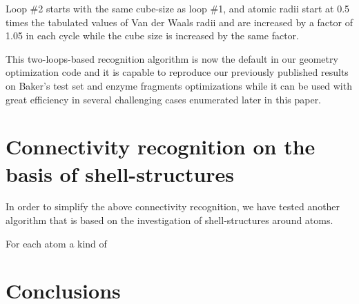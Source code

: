 \documentclass[prl,aps,preprint,superbib,12pt]{revtex4}
\begin{document}
Loop \#2 starts with the same cube-size as loop \#1, 
and atomic radii start at 0.5 times the tabulated values of 
Van der Waals radii \cite{webelements} and are increased by a 
factor of 1.05 in each cycle while the cube size is increased
by the same factor.

This two-loops-based recognition algorithm is now the default
in our geometry optimization code and it is capable to reproduce
our previously published results on Baker's test set and enzyme 
fragments optimizations \cite{KNemeth04} while it can
be used with great efficiency in several challenging cases
enumerated later in this paper.

\section{Connectivity recognition on the basis of shell-structures}
In order to simplify the above connectivity recognition, we have
tested another algorithm that is based on the investigation
of shell-structures around atoms.

For each atom a kind of 
\section{Conclusions} \label{Conclusions}


\end{document}
